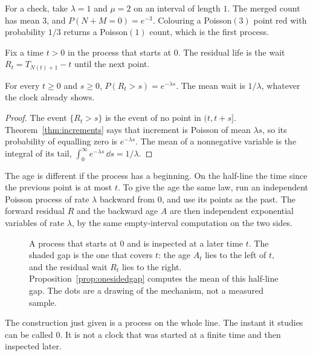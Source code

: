 For a check, take $\lambda=1$ and $\mu=2$ on an interval of length $1$. The merged count has mean $3$, and $P(N+M=0)=e^{-3}$. Colouring a Poisson$(3)$ point red with probability $1/3$ returns a Poisson$(1)$ count, which is the first process.

Fix a time $t>0$ in the process that starts at $0$. The residual life is the wait $R_t=T_{N(t)+1}-t$ until the next point.

\begin{proposition}\label{prop:residual}
For every $t\ge0$ and $s\ge0$, $P(R_t>s)=e^{-\lambda s}$. The mean wait is $1/\lambda$, whatever the clock already shows.
\end{proposition}
\begin{proof}
The event $\{R_t>s\}$ is the event of no point in $(t,t+s]$. Theorem~\ref{thm:increments} says that increment is Poisson of mean $\lambda s$, so its probability of equalling zero is $e^{-\lambda s}$. The mean of a nonnegative variable is the integral of its tail, $\int_0^\infty e^{-\lambda s}\,\dd s=1/\lambda$.
\end{proof}

The age is different if the process has a beginning. On the half-line the time since the previous point is at most $t$. To give the age the same law, run an independent Poisson process of rate $\lambda$ backward from $0$, and use its points as the past. The forward residual $R$ and the backward age $A$ are then independent exponential variables of rate $\lambda$, by the same empty-interval computation on the two sides.

\begin{figure}[ht]
\centering
{}
\caption{A process that starts at $0$ and is inspected at a later time $t$. The shaded gap is the one that covers $t$: the age $A_t$ lies to the left of $t$, and the residual wait $R_t$ lies to the right. Proposition~\ref{prop:onesidedgap} computes the mean of this half-line gap. The dots are a drawing of the mechanism, not a measured sample.}
\label{fig:inspection}
\end{figure}

The construction just given is a process on the whole line. The instant it studies can be called $0$. It is not a clock that was started at a finite time and then inspected later.

